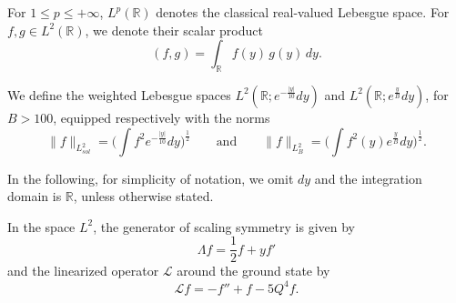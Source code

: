 \documentclass[16pt,english, oneside,reqno]{smfart}
\newcommand{\RR}{\mathbb{R}}
\begin{document}
For $1\leq p\leq +\infty$, $L^p(\RR)$ denotes the classical real-valued Lebesgue space. For $f,g \in L^2(\RR)$, we denote their scalar product
\begin{equation}
    (f,g) = \int_{\RR} f(y)\,g(y)\, dy.
\end{equation}

We define the weighted Lebesgue spaces $L^2(\RR; e^{-\frac{|y|}{10}}dy)$ and $L^2(\RR; e^{\frac{y}{B}}dy)$, for $B>100$, equipped respectively with the norms
\begin{equation}
    \|f\|_{L^2_{sol}} = \Big( \int f^2 e^{-\frac{|y|}{10}}dy\Big)^{\frac{1}{2}} \qquad \text{and} \qquad \|f\|_{L^2_B}= \Big( \int f^2(y) e^{\frac{y}{B}} dy \Big)^{\frac{1}{2}}.
\end{equation}

In the following, for simplicity of notation, we omit $dy$ and the integration domain is $\RR$, unless otherwise stated.

In the space $L^2$, the generator of scaling symmetry is given by
\begin{equation}
    \Lambda f = \frac{1}{2}f + yf'
\end{equation}
and the linearized operator $\mathcal{L}$ around the ground state by 
\begin{equation}
    \mathcal{L}f = -f''+f-5Q^4 f.
\end{equation}
\end{document}
